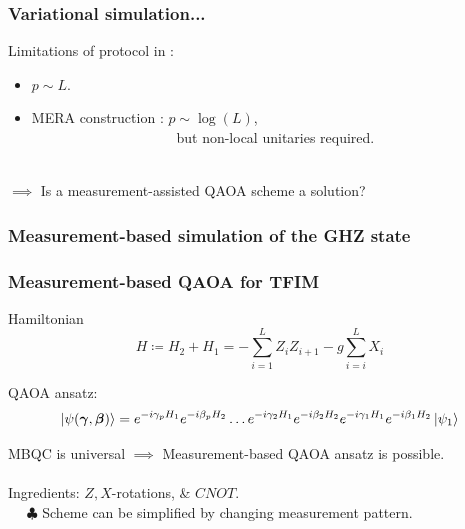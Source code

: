 \documentclass{beamer}
\theoremstyle{definition}
\begin{document}

\begin{frame}
\frametitle{Variational simulation...}


Limitations of protocol in \cite{VQCS}: 
\begin{itemize}
	
	
	\item  $p \sim L$.
	
	\item MERA construction \cite{MERA}: $p\sim \log(L)$, \\
	$\quad\quad\quad\quad\quad\quad\qquad\qquad$ but non-local unitaries required.
\end{itemize}

$\,$\\


$\implies$ Is a measurement-assisted QAOA scheme a solution?






\end{frame}


\begin{frame}


\frametitle{Measurement-based simulation of the GHZ state}





\end{frame}






\begin{frame}
\frametitle{Measurement-based QAOA for TFIM}

Hamiltonian
\begin{equation*}
H \coloneqq H_2 + H_1 =  - \sum_{i=1}^L Z_i Z_{i+1} - g\sum^L_{i=i}X_i
\end{equation*}


QAOA ansatz:
\begin{equation*}
\left\vert{\psi(\bm{\gamma}, \bm{\beta})}\right\rangle =  \strut {e^{-i\gamma_p H_1}e^{-i\beta_p H_2}} \dots {e^{-i\gamma_2 H_1}e^{-i\beta_2 H_2}} {e^{-i\gamma_1 H_1}e^{-i\beta_1 H_2}} \left\vert{\psi_1}\right\rangle
\end{equation*}

MBQC is universal $\implies$ Measurement-based QAOA ansatz is possible. \\

$\,$\\

Ingredients: $Z,X$-rotations, \& $CNOT$. \\

$\quad$ $\clubsuit$ Scheme can be simplified by changing measurement pattern.  

\end{frame}
\end{document}
